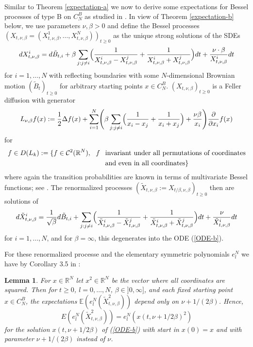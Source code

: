 \documentclass[reqno]{amsart}
\def\cal{\mathcal }
\theoremstyle{plain}
\newtheorem{lemma}[theorem]{Lemma}
\theoremstyle{definition}
\numberwithin{equation}{section}
\begin{document}
Similar to Theorem \ref{expectation-a} we now 
 to derive some expectations for Bessel processes of type B on  $C_N^B$
as studied in \cite{CGY, RV1, AKM2, AV1, AV2, V3}. In view of Theorem \ref{expectation-b} below, we use parameters
$\nu,\beta>0$ and define the Bessel processes  $(X_{t,\nu,\beta}=(X_{t,\nu,\beta}^1,\ldots,X_{t,\nu,\beta}^N))_{t\ge0}$
as the unique strong solutions of the SDEs
 \begin{equation}\label{SDE-B}
dX_{t,\nu,\beta}^i = d\tilde B_{t,i}+ \beta \sum_{j: j\ne i}
\Bigl(\frac{1}{X_{t,\nu,\beta}^i-X_{t,\nu,\beta}^j}+
\frac{1}{X_{t,\nu,\beta}^i+X_{t,\nu,\beta}^j}\Bigr)dt
+ \frac{\nu\cdot\beta}{X_{t,\nu,\beta}^i}dt \end{equation}
 for $i=1,\ldots,N$ with reflecting boundaries
 with some $N$-dimensional Brownian motion $(\tilde B_t)_{t\ge0}$ for arbitrary starting points $x\in C_N^B$.
  $(X_{t,\nu,\beta})_{t\ge0}$ is a Feller diffusion with generator
\begin{equation}\label{generator-laguerre-intro}
  L_{\nu,\beta}f(x):= \frac{1}{2} \Delta f(x) + \sum_{i=1}^N\Biggl( 
  \beta \sum_{j: j\ne i} \Bigl(\frac{1}{x_i-x_j}+\frac{1}{x_i+x_j}\Bigr)+
\frac{\nu\beta}{x_i}\Biggr) \frac{\partial}{\partial x_i}f(x) 
 \end{equation}
 for
 \begin{align}
   f\in D(L_k):=\{f\in \cal C^{2}(\mathbb R^N), 
   \>\>\> f\>\>&\text{ invariant under all permutations of coordinates}\notag\\
&\text{ and even in all coordinates}\}
 \notag \end{align} 
 where again the transition probabilities are known in terms of multivariate Bessel functions; see \cite{R1, R2,  RV1, V3}.
The  renormalized processes $(\tilde X_{t,\nu,\beta}:=X_{t/\beta,\nu,\beta})_{t\ge0}$ then are solutions of
\begin{equation}\label{SDE-B-normalized}
d\tilde X_{t,\nu,\beta}^i = \frac{1}{\sqrt \beta}d\tilde B_{t,i}+  \sum_{j: j\ne i}
\Bigl(\frac{1}{\tilde X_{t,\nu,\beta}^i-\tilde X_{t,\nu,\beta}^j}+
\frac{1}{\tilde X_{t,\nu,\beta}^i+\tilde X_{t,\nu,\beta}^j}\Bigr)dt
+ \frac{\nu}{\tilde X_{t,\nu,\beta}^i}dt \end{equation}
for $i=1,\ldots,N$, and  for  $\beta=\infty$, this   degenerates into the ODE (\ref{ODE-b}).

For these renormalized processe and the elementary
symmetric polynomials $e_l^N$ we have by Corollary 3.5 in \cite{KVW}:

\begin{lemma}\label{indepenndence-exp-b}
For  $x\in\mathbb R^N$ let $x^2\in\mathbb R^N $ be the vector where all coordinates are squared.
Then for  $t\ge0$, $l=0,\ldots,N$, $\beta\in]0,\infty]$, and each fixed starting point $x\in C_N^B$,
 the expectations
$\mathbb E( e_l^N(\tilde X_{t,\nu,\beta}^2) )$ depend only on $\nu+1/(2\beta)$.
Hence,
 $$E( e_l^N(\tilde X_{t,\nu,\beta}^2))=  e_l^N(x(t,\nu+1/2\beta)^2)$$
 for the solution $x(t,\nu+1/2\beta)$ of  (\ref{ODE-b}) with start in
 $x(0)=x$ and with parameter $\nu+1/(2\beta)$ instead of $\nu$.
\end{lemma}
\end{document}
